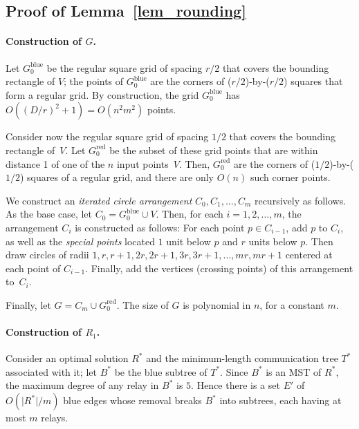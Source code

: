 \documentclass[11pt,a4paper]{article}
\newcommand{\s}[1]{{\lvert #1 \rvert}}
\newcommand{\optrel}{R^{*}}
\newcommand{\blue}{\text{blue}}
\newcommand{\red}{\text{red}}
\theoremstyle{definition}
\theoremstyle{remark}
\begin{document}
\subsection{Proof of Lemma~\ref{lem_rounding}}\label{sec_lem_rounding}

\paragraph{\boldmath Construction of $G$.}


Let $G_0^{\blue}$ be the regular square grid of spacing $r/2$ that
covers the bounding rectangle of $V$; the points of $G_0^{\blue}$ are
the corners of ($r/2$)-by-($r/2$) squares that form a regular grid.
By construction, the grid $G_0^{\blue}$ has ${O((D/r)^2 + 1)} = O(n^2 m^2)$ points.

Consider now the regular square grid of spacing $1/2$ that covers the
bounding rectangle of~$V$.  Let $G_0^{\red}$ be the subset of these
grid points that are within distance 1 of one of the $n$ input points~$V$.
Then, $G_0^{\red}$ are the corners of ($1/2$)-by-($1/2$) squares
of a regular grid, and there are only $O(n)$ such corner points.

We construct an \emph{iterated circle arrangement} $C_0, C_1, \dotsc, C_m$ recursively as follows. As the base case, let $C_0 = G_0^{\blue}\cup V$. Then, for each $i = 1, 2, \dotsc, m$, the arrangement $C_i$ is constructed as follows: For each point $p \in C_{i-1}$, add $p$ to $C_i$, as well as the \emph{special points} located $1$ unit below $p$ and $r$ units below $p$. Then draw circles of radii $1,r,r+1,2r,2r+1,3r,3r+1,\dotsc,mr,mr+1$ centered at each point of $C_{i-1}$. Finally, add the vertices (crossing points) of this arrangement to~$C_i$.

Finally, let $G = C_m\cup G_0^{\red}$. The size of $G$ is polynomial in $n$, for a constant $m$.

\paragraph{\boldmath Construction of $R_1$.}

Consider an optimal solution $\optrel$ and the minimum-length communication tree $T^*$ associated with it; let $B^*$ be the blue subtree of $T^*$. Since $B^*$ is an MST of $\optrel$, the maximum degree of any relay in $B^*$ is $5$. Hence there is a set $E'$ of $O(\s{R^*}/m)$ blue edges whose removal breaks $B^*$ into subtrees, each having at most $m$ relays.
\end{document}

